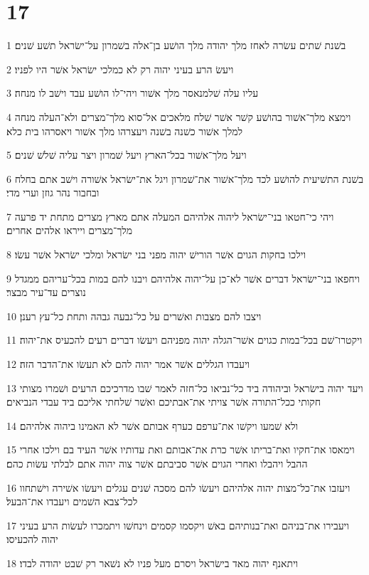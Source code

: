 \chapter{17}

\par 1 בשׁנת שׁתים עשׂרה לאחז מלך יהודה מלך הושׁע בן־אלה בשׁמרון על־ישׂראל תשׁע שׁנים׃
\par 2 ויעשׂ הרע בעיני יהוה רק לא כמלכי ישׂראל אשׁר היו לפניו׃
\par 3 עליו עלה שׁלמנאסר מלך אשׁור ויהי־לו הושׁע עבד וישׁב לו מנחה׃
\par 4 וימצא מלך־אשׁור בהושׁע קשׁר אשׁר שׁלח מלאכים אל־סוא מלך־מצרים ולא־העלה מנחה למלך אשׁור כשׁנה בשׁנה ויעצרהו מלך אשׁור ויאסרהו בית כלא׃
\par 5 ויעל מלך־אשׁור בכל־הארץ ויעל שׁמרון ויצר עליה שׁלשׁ שׁנים׃
\par 6 בשׁנת התשׁיעית להושׁע לכד מלך־אשׁור את־שׁמרון ויגל את־ישׂראל אשׁורה וישׁב אתם בחלח ובחבור נהר גוזן וערי מדי׃
\par 7 ויהי כי־חטאו בני־ישׂראל ליהוה אלהיהם המעלה אתם מארץ מצרים מתחת יד פרעה מלך־מצרים וייראו אלהים אחרים׃
\par 8 וילכו בחקות הגוים אשׁר הורישׁ יהוה מפני בני ישׂראל ומלכי ישׂראל אשׁר עשׂו׃
\par 9 ויחפאו בני־ישׂראל דברים אשׁר לא־כן על־יהוה אלהיהם ויבנו להם במות בכל־עריהם ממגדל נוצרים עד־עיר מבצר׃
\par 10 ויצבו להם מצבות ואשׁרים על כל־גבעה גבהה ותחת כל־עץ רענן׃
\par 11 ויקטרו־שׁם בכל־במות כגוים אשׁר־הגלה יהוה מפניהם ויעשׂו דברים רעים להכעיס את־יהוה׃
\par 12 ויעבדו הגללים אשׁר אמר יהוה להם לא תעשׂו את־הדבר הזה׃
\par 13 ויעד יהוה בישׂראל וביהודה ביד כל־נביאו כל־חזה לאמר שׁבו מדרכיכם הרעים ושׁמרו מצותי חקותי ככל־התורה אשׁר צויתי את־אבתיכם ואשׁר שׁלחתי אליכם ביד עבדי הנביאים׃
\par 14 ולא שׁמעו ויקשׁו את־ערפם כערף אבותם אשׁר לא האמינו ביהוה אלהיהם׃
\par 15 וימאסו את־חקיו ואת־בריתו אשׁר כרת את־אבותם ואת עדותיו אשׁר העיד בם וילכו אחרי ההבל ויהבלו ואחרי הגוים אשׁר סביבתם אשׁר צוה יהוה אתם לבלתי עשׂות כהם׃
\par 16 ויעזבו את־כל־מצות יהוה אלהיהם ויעשׂו להם מסכה שׁנים עגלים ויעשׂו אשׁירה וישׁתחוו לכל־צבא השׁמים ויעבדו את־הבעל׃
\par 17 ויעבירו את־בניהם ואת־בנותיהם באשׁ ויקסמו קסמים וינחשׁו ויתמכרו לעשׂות הרע בעיני יהוה להכעיסו׃
\par 18 ויתאנף יהוה מאד בישׂראל ויסרם מעל פניו לא נשׁאר רק שׁבט יהודה לבדו׃
